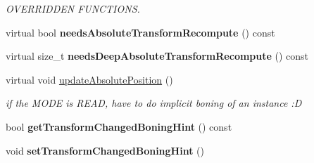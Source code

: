 \begin{DoxyCompactItemize}
\begin{DoxyCompactList}\small\item\em O\+V\+E\+R\+R\+I\+D\+D\+EN F\+U\+N\+C\+T\+I\+O\+NS. \end{DoxyCompactList}\item 
virtual bool {\bfseries needs\+Absolute\+Transform\+Recompute} () const \hypertarget{classirr_1_1scene_1_1ISkinningStateManager_1_1IBoneSceneNode_a1719818c1c7c746d55221015034ddd97}{}\label{classirr_1_1scene_1_1ISkinningStateManager_1_1IBoneSceneNode_a1719818c1c7c746d55221015034ddd97}

\item 
virtual size\+\_\+t {\bfseries needs\+Deep\+Absolute\+Transform\+Recompute} () const \hypertarget{classirr_1_1scene_1_1ISkinningStateManager_1_1IBoneSceneNode_aa4bcdd303e29df104fa19ec5af857e59}{}\label{classirr_1_1scene_1_1ISkinningStateManager_1_1IBoneSceneNode_aa4bcdd303e29df104fa19ec5af857e59}

\item 
virtual void \hyperlink{classirr_1_1scene_1_1ISkinningStateManager_1_1IBoneSceneNode_a32bd793195468797fb07249946a8be21}{update\+Absolute\+Position} ()\hypertarget{classirr_1_1scene_1_1ISkinningStateManager_1_1IBoneSceneNode_a32bd793195468797fb07249946a8be21}{}\label{classirr_1_1scene_1_1ISkinningStateManager_1_1IBoneSceneNode_a32bd793195468797fb07249946a8be21}

\begin{DoxyCompactList}\small\item\em if the M\+O\+DE is R\+E\+AD, have to do implicit boning of an instance \+:D \end{DoxyCompactList}\item 
bool {\bfseries get\+Transform\+Changed\+Boning\+Hint} () const \hypertarget{classirr_1_1scene_1_1ISkinningStateManager_1_1IBoneSceneNode_a6f4044ae71a568c1f4d42130763b329c}{}\label{classirr_1_1scene_1_1ISkinningStateManager_1_1IBoneSceneNode_a6f4044ae71a568c1f4d42130763b329c}

\item 
void {\bfseries set\+Transform\+Changed\+Boning\+Hint} ()\hypertarget{classirr_1_1scene_1_1ISkinningStateManager_1_1IBoneSceneNode_a2ff6348df87f35dc49cb2c82356d925c}{}\label{classirr_1_1scene_1_1ISkinningStateManager_1_1IBoneSceneNode_a2ff6348df87f35dc49cb2c82356d925c}

\end{DoxyCompactItemize}
